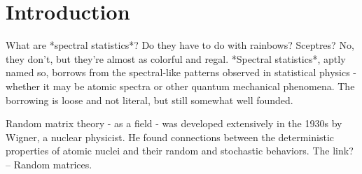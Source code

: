 
  \chapter*{Introduction}
	
	
What are *spectral statistics*? Do they have to do with rainbows? Sceptres? No, they don't, but they're almost as colorful and regal. *Spectral statistics*, aptly named so, borrows from the spectral-like patterns observed in statistical physics - whether it may be atomic spectra or other quantum mechanical phenomena. The borrowing is loose and not literal, but still somewhat well founded. 

Random matrix theory - as a field - was developed extensively in the 1930s by Wigner, a nuclear physicist. He found connections between the deterministic properties of atomic nuclei and their random and stochastic behaviors. The link? -- Random matrices.   




